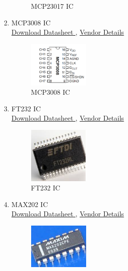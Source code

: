 \documentclass[a4paper,12pt,oneside]{book}
\begin{document}
\begin{itemize}
\begin{enumerate}
\begin{figure}[h]
		\caption{ MCP23017 IC }
	\end{figure}
 \item MCP3008 IC       \\
\href{https://cdn-shop.adafruit.com/datasheets/MCP3008.pdf} {Download Datasheet ,}
\href{http://www.dnatechindia.com/MCP3008-10-Bit-ADC.html} {Vendor Details}
\begin{figure}[h]
	\hspace{4cm}
	\includegraphics[width=0.3\textwidth]{mcp3008}
	\caption{ MCP3008 IC }
\end{figure}
\item FT232 IC       \\
\href{www.ftdichip.com/Documents/DataSheets/ICs/DS_FT232R.pdf
} {Download Datasheet ,}
\href{http://www.dnatechindia.com/ft-232-usb-uart-ic.html} {Vendor Details}
\begin{figure}[h]
	\hspace{4cm}
	\includegraphics[width=0.3\textwidth]{ft232}
	\caption{ FT232 IC }
\end{figure}
\item MAX202 IC       \\
\href{www.ti.com/lit/ds/symlink/max202.pdf
} {Download Datasheet ,}
\href{https://www.tanotis.com/products/tanotis-2pcs-maxim-integrated-products-max202-max202ese-max202ese} {Vendor Details}
\begin{figure}[h]
	\hspace{4cm}
	\includegraphics[width=0.3\textwidth]{max202}

\end{figure}
\end{enumerate}
\end{itemize}
\end{document}
